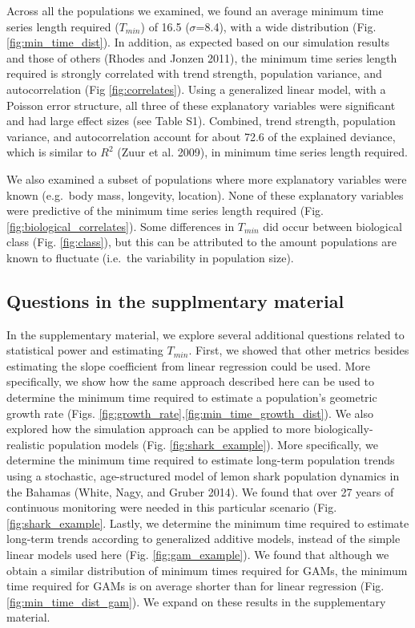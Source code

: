 \documentclass[12pt,]{article}
\begin{document}
Across all the populations we examined, we found an average minimum time
series length required (\(T_{min}\)) of 16.5 (\(\sigma\)=8.4), with a
wide distribution (Fig. \ref{fig:min_time_dist}). In addition, as
expected based on our simulation results and those of others (Rhodes and
Jonzen 2011), the minimum time series length required is strongly
correlated with trend strength, population variance, and autocorrelation
(Fig \ref{fig:correlates}). Using a generalized linear model, with a
Poisson error structure, all three of these explanatory variables were
significant and had large effect sizes (see Table S1). Combined, trend
strength, population variance, and autocorrelation account for about
72.6 of the explained deviance, which is similar to \(R^2\) (Zuur et al.
2009), in minimum time series length required.

We also examined a subset of populations where more explanatory
variables were known (e.g.~body mass, longevity, location). None of
these explanatory variables were predictive of the minimum time series
length required (Fig. \ref{fig:biological_correlates}). Some differences
in \(T_{min}\) did occur between biological class (Fig.
\ref{fig:class}), but this can be attributed to the amount populations
are known to fluctuate (i.e.~the variability in population size).

\subsection{Questions in the supplmentary
material}\label{questions-in-the-supplmentary-material}

In the supplementary material, we explore several additional questions
related to statistical power and estimating \(T_{min}\). First, we
showed that other metrics besides estimating the slope coefficient from
linear regression could be used. More specifically, we show how the same
approach described here can be used to determine the minimum time
required to estimate a population's geometric growth rate (Figs.
\ref{fig:growth_rate},\ref{fig:min_time_growth_dist}). We also explored
how the simulation approach can be applied to more
biologically-realistic population models (Fig. \ref{fig:shark_example}).
More specifically, we determine the minimum time required to estimate
long-term population trends using a stochastic, age-structured model of
lemon shark population dynamics in the Bahamas (White, Nagy, and Gruber
2014). We found that over 27 years of continuous monitoring were needed
in this particular scenario (Fig. \ref{fig:shark_example}. Lastly, we
determine the minimum time required to estimate long-term trends
according to generalized additive models, instead of the simple linear
models used here (Fig. \ref{fig:gam_example}). We found that although we
obtain a similar distribution of minimum times required for GAMs, the
minimum time required for GAMs is on average shorter than for linear
regression (Fig. \ref{fig:min_time_dist_gam}). We expand on these
results in the supplementary material.
\end{document}
